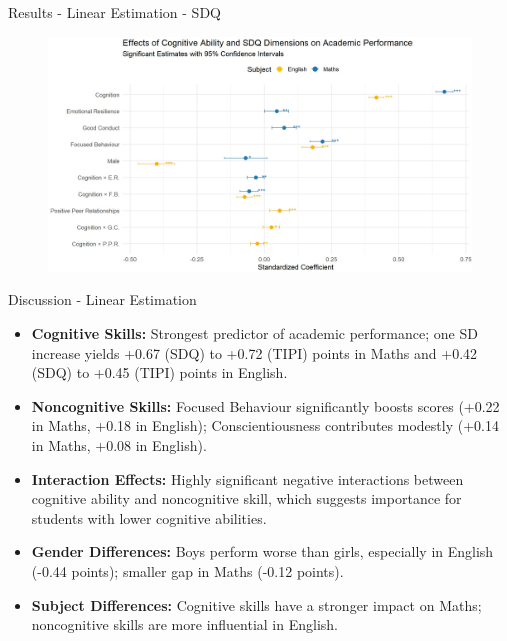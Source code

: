 \documentclass{beamer}
\begin{document}
\begin{frame}{Results - Linear Estimation - SDQ}
\begin{figure}[h!]
    \centering
    \includegraphics[width=1\linewidth]{SDQ_Linear_Estimates.JPG}
    \label{fig:your_label}
\end{figure}
\end{frame}

\begin{frame}{Discussion - Linear Estimation}

\begin{itemize}
\item \textbf{Cognitive Skills:} Strongest predictor of academic performance; one SD increase yields +0.67 (SDQ) to +0.72 (TIPI) points in Maths and +0.42 (SDQ) to +0.45 (TIPI) points in English.
    
    \item \textbf{Noncognitive Skills:} Focused Behaviour significantly boosts scores (+0.22 in Maths, +0.18 in English); Conscientiousness contributes modestly (+0.14 in Maths, +0.08 in English).

    \item \textbf{Interaction Effects:} Highly significant negative interactions between cognitive ability and noncognitive skill, which suggests importance for students with lower cognitive abilities.
    
    \item \textbf{Gender Differences:} Boys perform worse than girls, especially in English (-0.44 points); smaller gap in Maths (-0.12 points).

    \item \textbf{Subject Differences:} Cognitive skills have a stronger impact on Maths; noncognitive skills are more influential in English.
\end{itemize}
\end{frame}
\end{document}
